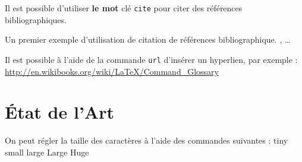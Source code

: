 \documentclass[twocolumn,a4paper]{IEEEtranfr}
\begin{document}
Il est possible d'utiliser {\color{blue}\textbf{le mot}} clé {\tt{cite}} pour citer des références
bibliographiques.  

Un premier exemple d'utilisation de citation de références bibliographique. 
\cite{akgu07},\cite{akgu091}\cite{zwic00} \ldots

Il est possible à l'aide de la commande {\tt url{}} d'insérer un
hyperlien, par exemple : \url{http://en.wikibooks.org/wiki/LaTeX/Command_Glossary}

\section{État de l'Art} 
On peut régler la taille des caractères à l'aide des commandes suivantes : 
{\tiny tiny \small small \large large \Large Large \Huge Huge}
\par
\end{document}
